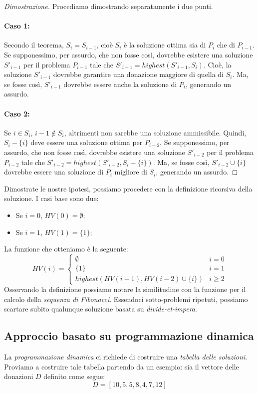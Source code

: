 \begin{proof}[Dimostrazione]
    Procediamo dimostrando separatamente i due punti.
    \paragraph{Caso 1: }
    Secondo il teorema, $S_i=S_{i-1}$, cioè $S_i$ è la soluzione ottima sia di
    $P_i$ che di $P_{i-1}$. Se supponessimo, per assurdo, che non fosse così,
    dovrebbe esistere una soluzione $S'_{i-1}$ per il problema $P_{i-1}$ tale
    che $S'_{i-1}=highest\left(S'_{i-1}, S_i\right)$. Cioè, la soluzione $S'_{i-1}$
    dovrebbe garantire una donazione maggiore di quella di $S_i$. Ma, se fosse
    così, $S'_{i-1}$ dovrebbe essere anche la soluzione di $P_i$, generando un
    assurdo.

    \paragraph{Caso 2: }
    Se $i\in S_i$, $i-1\notin S_i$, altrimenti non sarebbe una soluzione
    ammissibile. Quindi, $S_i-\{i\}$ deve essere una soluzione ottima per
    $P_{i-2}$. Se supponessimo, per assurdo, che non fosse così, dovrebbe
    esistere una soluzione $S'_{i-2}$ per il problema $P_{i-2}$ tale che
    $S'_{i-2}=highest\left(S'_{i-2}, S_i-\{i\}\right)$. Ma, se fosse così,
    $S'_{i-2}\cup\{i\}$ dovrebbe essere una soluzione di $P_i$ migliore di
    $S_i$, generando un assurdo.
\end{proof}\noindent
Dimostrate le nostre ipotesi, possiamo procedere con la definizione ricorsiva
della soluzione. I casi base sono due:
\begin{itemize}
    \item Se $i=0$, $HV(0)=\emptyset$;
    \item Se $i=1$, $HV(1)=\{1\}$;
\end{itemize}
La funzione che otteniamo è la seguente:
\[HV(i)=\begin{cases}
    \emptyset & i=0\\
    \{1\} & i=1\\
    highest\left(HV(i-1), HV(i-2)\cup\{i\}\right) & i\geq2
\end{cases}\]
Osservando la definizione possiamo notare la similitudine con la funzione per il
calcolo della \emph{sequenza di Fibonacci}. Essendoci sotto-problemi ripetuti,
possiamo scartare subito qualunque soluzione basata su \emph{divide-et-impera}.

\subsection{Approccio basato su programmazione dinamica}
La \emph{programmazione dinamica} ci richiede di costruire una \emph{tabella
delle soluzioni}. Proviamo a costruire tale tabella partendo da un esempio:
sia il vettore delle donazioni $D$ definito come segue:
\[D=[10,5,5,8,4,7,12]\]

